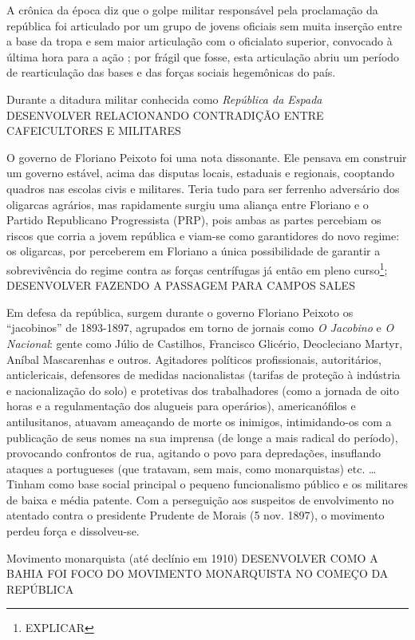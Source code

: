 A crônica da época diz que o golpe militar responsável pela proclamação da república foi articulado por um grupo de jovens oficiais sem muita inserção entre a base da tropa e sem maior articulação com o oficialato superior, convocado à última hora para a ação \cite[p.~16]{cardoso_govmil_1977}; por frágil que fosse, esta articulação abriu um período de rearticulação das bases e das forças sociais hegemônicas do país. 

Durante a ditadura militar conhecida como \textit{República da Espada} DESENVOLVER RELACIONANDO CONTRADIÇÃO ENTRE CAFEICULTORES E MILITARES

O governo de Floriano Peixoto foi uma nota dissonante. Ele pensava em construir um governo estável, acima das disputas locais, estaduais e regionais, cooptando quadros nas escolas civis e militares. Teria tudo para ser ferrenho adversário dos oligarcas agrários, mas rapidamente surgiu uma aliança entre Floriano e o Partido Republicano Progressista (PRP), pois ambas as partes percebiam os riscos que corria a jovem república e viam-se como garantidores do novo regime: os oligarcas, por perceberem em Floriano a única possibilidade de garantir a sobrevivência do regime contra as forças centrífugas já então em pleno curso\footnote{EXPLICAR}; DESENVOLVER FAZENDO A PASSAGEM PARA CAMPOS SALES

Em defesa da república, surgem durante o governo Floriano Peixoto os ``jacobinos'' de 1893-1897, agrupados em torno de jornais como \textit{O Jacobino} e \textit{O Nacional}: gente como Júlio de Castilhos, Francisco Glicério, Deocleciano Martyr, Aníbal Mascarenhas e outros. Agitadores políticos profissionais, autoritários, anticlericais, defensores de medidas nacionalistas (tarifas de proteção à indústria e nacionalização do solo) e protetivas dos trabalhadores (como a jornada de oito horas e a regulamentação dos alugueis para operários), americanófilos e antilusitanos, atuavam ameaçando de morte os inimigos, intimidando-os com a publicação de seus nomes na sua imprensa (de longe a mais radical do período), provocando confrontos de rua, agitando o povo para depredações, insuflando ataques a portugueses (que tratavam, sem mais, como monarquistas) etc. \cite{queiroz_radicais_1986}\dots Tinham como base social principal o pequeno funcionalismo público e os militares de baixa e média patente. Com a perseguição aos suspeitos de envolvimento no atentado contra o presidente Prudente de Morais (5 nov. 1897), o movimento perdeu força e dissolveu-se.

Movimento monarquista (até declínio em 1910) \cite{CARONE1970inst,janotti_subversivos_1986} DESENVOLVER COMO A BAHIA FOI FOCO DO MOVIMENTO MONARQUISTA NO COMEÇO DA REPÚBLICA

